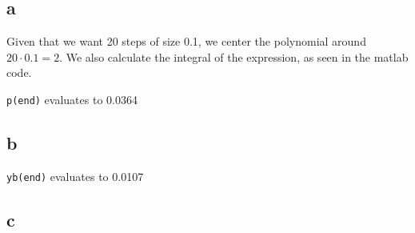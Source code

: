 \subsection{a}
Given that we want 20 steps of size 0.1, we center the polynomial around $20 \cdot 0.1 = 2$.
We also calculate the integral of the expression, as seen in the matlab code.


\texttt{p(end)} evaluates to 0.0364

\pagebreak
\subsection{b}



\texttt{yb(end)} evaluates to 0.0107

\subsection{c}


